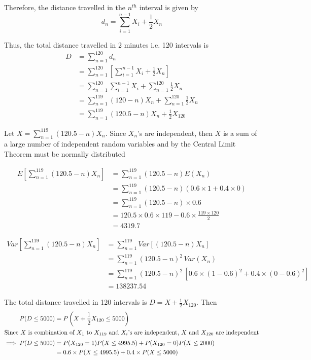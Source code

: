 \documentclass[12pt, oneside]{article}
\begin{document}
\begin{enumerate}
{    Therefore, the distance travelled in the \(n^{th}\) interval is given by
    \[
        d_n = \sum_{i=1}^{n-1} X_i + \frac{1}{2} X_n
    \]

    Thus, the total distance travelled in 2 minutes i.e. 120 intervals is
    \begin{align*}
        D &= \sum_{n = 1}^{120} d_n \\
          &= \sum_{n = 1}^{120} \left[\sum_{i=1}^{n-1} X_i + \frac{1}{2} X_n\right] \\
          &= \sum_{n = 1}^{120} \sum_{i=1}^{n-1} X_i + \sum_{n = 1}^{120} \frac{1}{2} X_n \\
          &= \sum_{n = 1}^{119} (120 - n) X_n + \sum_{n = 1}^{120} \frac{1}{2} X_n 
                          \tag*{(Expanding the double summation)} \\   
          &= \sum_{n = 1}^{119} (120.5 - n) X_n + \frac{1}{2}X_{120}
    \end{align*}

    Let \(X = \sum_{n = 1}^{119} (120.5 - n) X_n\). Since \(X_n\)'s are independent,
    then \(X\) is a sum of a large number of independent random variables and by the
    Central Limit Theorem must be normally distributed

    \begin{align*}
        E\left[\sum_{n = 1}^{119} (120.5 - n) X_n\right] &= \sum_{n = 1}^{119} (120.5 - n) E(X_n) \\
            &= \sum_{n = 1}^{119} (120.5 - n) (0.6 \times 1 + 0.4 \times 0) \\
            &= \sum_{n = 1}^{119} (120.5 - n) \times 0.6 \\
            &= 120.5 \times 0.6 \times 119 - 0.6 \times \frac{119 \times 120}{2} \\
            &= 4319.7
    \end{align*}

    \begin{align*}
        Var\left[\sum_{n = 1}^{119} (120.5 - n) X_n\right]
            &= \sum_{n = 1}^{119} Var\left[(120.5 - n) X_n\right] \tag*{(As the rv's are independent)} \\
            &= \sum_{n = 1}^{119} (120.5 - n)^2 \, Var(X_n) \\
            &= \sum_{n = 1}^{119} (120.5 - n)^2 \, [0.6 \times (1 - 0.6)^2 + 0.4 \times (0 - 0.6)^2] \\
            &= 138237.54
    \end{align*}

    The total distance travelled in 120 intervals is \(D = X + \frac{1}{2} X_{120}\). Then 
    \begin{align*}
        P(D \leq 5000) &= P\left(X + \frac{1}{2} X_{120} \leq 5000\right) \\
        \intertext{Since \(X\) is combination of \(X_1\) to \(X_{119}\) and \(X_{i}\)'s 
                    are independent, \(X\) and \(X_{120}\) are independent}
        \implies P(D \leq 5000) &= P(X_{120} = 1) P(X \leq 4995.5) + P(X_{120} = 0) P(X \leq 2000) \\
            &= 0.6 \times P(X \leq 4995.5) + 0.4 \times P(X \leq 5000)
    \end{align*}

}
\end{enumerate}
\end{document}
